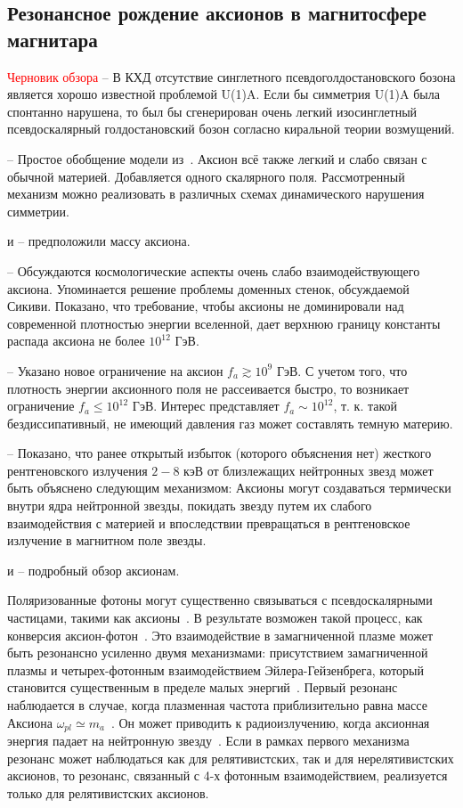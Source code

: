 \subsection{Резонансное рождение аксионов в магнитосфере магнитара}
\textcolor{red}{Черновик обзора}
\cite{Weinberg:1975} -- В КХД отсутствие синглетного псевдоголдостановского 
бозона является хорошо известной проблемой U(1)A. Если бы симметрия U(1)A была 
спонтанно нарушена, то был бы сгенерирован очень легкий изосинглетный 
псевдоскалярный голдостановский бозон согласно киральной теории возмущений.

\cite{Dine:1981} -- Простое обобщение модели из~\cite{Quinn:1977}. Аксион всё также легкий и слабо связан с обычной материей. Добавляется одного скалярного поля. Рассмотренный механизм можно реализовать в различных схемах динамического нарушения симметрии.

\cite{Weinberg:1978} и \cite{Wilczek:1978} -- предположили массу аксиона.

\cite{Dine:1983} -- Обсуждаются космологические аспекты очень слабо взаимодействующего аксиона. Упоминается решение проблемы доменных стенок, обсуждаемой Сикиви. Показано, что требование, чтобы аксионы не доминировали над современной плотностью энергии вселенной, дает верхнюю границу константы распада аксиона не более $10^{12}$ ГэВ.

\cite{Preskill:1983} -- Указано новое ограничение на аксион $f_a\gtrsim 10^9$ ГэВ. С учетом того, что плотность энергии аксионного поля не рассеивается быстро, то возникает ограничение $f_a\leqslant10^{12}$ ГэВ. Интерес представляет $f_a\sim 10^{12}$, т. к. такой бездиссипативный, не имеющий давления газ может составлять темную материю.

\cite{Buschmann:2021} -- Показано, что ранее открытый избыток (которого объяснения нет) жесткого рентгеновского излучения $2-8$ кэВ от близлежащих нейтронных звезд может быть объяснено следующим механизмом: Аксионы могут создаваться термически внутри ядра нейтронной звезды, покидать звезду путем их слабого взаимодействия с материей и впоследствии превращаться в рентгеновское излучение в магнитном поле звезды.

\cite{Kim:2010} и \cite{Marsh:2016} -- подробный обзор аксионам.

Поляризованные фотоны могут существенно связываться с псевдоскалярными частицами, такими как аксионы~\cite{Sikivie:1983}. В результате возможен такой процесс, как конверсия аксион-фотон~\cite{Raffelt:1988}. Это взаимодействие в замагниченной плазме может быть резонансно усиленно двумя механизмами: присутствием замагниченной плазмы и четырех-фотонным взаимодействием Эйлера-Гейзенбрега, который становится существенным в пределе малых энергий~\cite{Lai:2006}. Первый резонанс наблюдается в случае, когда плазменная частота приблизительно равна массе Аксиона $\omega_{pl}\simeq m_a$~\cite{Yanagida:1988}. Он может приводить к радиоизлучению, когда аксионная энергия падает на нейтронную звезду~\cite{Pshirkov:2009}. Если в рамках первого механизма резонанс может наблюдаться как для релятивистских, так и для нерелятивистских аксионов, то резонанс, связанный с 4-х фотонным взаимодействием, реализуется только для релятивистских аксионов.

